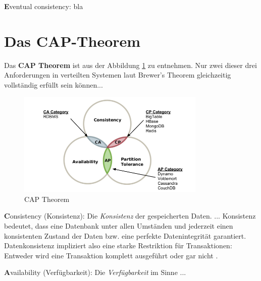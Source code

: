 \textbf{E}ventual consistency: bla

\section{Das CAP-Theorem}


Das \textbf{CAP Theorem} ist aus der Abbildung \ref{img:cap} zu entnehmen. Nur zwei dieser drei Anforderungen in verteilten Systemen laut Brewer's Theorem gleichzeitig vollständig erfüllt sein können...
\begin{figure}
\centering
\includegraphics[width=0.8\textwidth]{resources/captheorem2}
\caption[bla]{CAP Theorem\protect\footnotemark}
\label{img:cap}
\end{figure}

\textbf{C}onsistency (Konsistenz): Die \textit{Konsistenz} der gespeicherten Daten. ...
Konsistenz bedeutet, dass eine Datenbank unter allen Umständen und jederzeit einen konsistenten Zustand der Daten bzw. eine perfekte Datenintegrität garantiert. Datenkonsistenz impliziert also eine starke Restriktion für Transaktionen: Entweder wird eine Transaktion komplett ausgeführt oder gar nicht \cite[S. 13]{Kurowski.2012}.

\textbf{A}vailability (Verfügbarkeit): Die \textit{Verfügbarkeit} im Sinne ...

